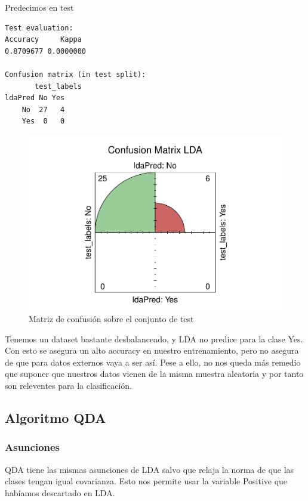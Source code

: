 Predecimos en test

\begin{verbatim}
Test evaluation:
Accuracy     Kappa 
0.8709677 0.0000000 

Confusion matrix (in test split):
       test_labels
ldaPred No Yes
    No  27   4
    Yes  0   0
\end{verbatim}

\begin{figure}[H]\center\includegraphics[width=.9\linewidth]{img/Clasificacion_files/figure-latex/unnamed-chunk-21-1}\caption{Matriz de confusión sobre el conjunto de test}\end{figure}

Tenemos un dataset bastante desbalanceado, y LDA no predice para la clase Yes. Con esto se asegura un alto accuracy en nuestro entrenamiento, pero no asegura de que para datos externos vaya a ser así. Pese a ello, no nos queda más remedio que suponer que nuestros datos vienen de la misma muestra aleatoria y por tanto son releventes para la clasificación.

\subsection{Algoritmo QDA}
\subsubsection{Asunciones}

QDA tiene las mismas asunciones de LDA salvo que relaja la norma de que las clases tengan igual covarianza. Esto nos permite usar la variable Positive que habíamos descartado en LDA.

\vspace{\baselineskip}

